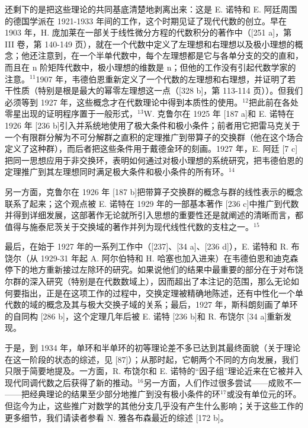 还剩下的是把这些理论的共同基底清楚地剥离出来：这是 E. 诺特和 E. 阿廷周围的德国学派在 1921-1933 年间的工作，这个时期见证了现代代数的创立。早在 1903 年，H. 庞加莱在一部关于线性微分方程的代数积分的著作中（{[}251 a{]}，第 III 卷，第 140-149 页），就在一个代数中定义了左理想和右理想以及极小理想的概念；他还注意到，在一个半单代数中，每个左理想都是它与各单分支的交的直和，而且在 n 阶矩阵代数中，极小理想的维数是 n；但他的工作没有引起代数学家的注意。\(^{11}\)1907 年，韦德伯恩重新定义了一个代数的左理想和右理想，并证明了若干性质（特别是根是最大的幂零左理想这一点（{[}328 b{]}，第 113-114 页））。但我们必须等到 1927 年，这些概念才在代数理论中得到本质性的使用。\(^{12}\)把此前在各处零星出现的证明程序置于一般形式，\(^{13}\)W. 克鲁尔在 1925 年 {[}187 a{]}和 E. 诺特在 1926 年 {[}236 b{]}引入并系统地使用了极大条件和极小条件；前者用它把雷马克关于一个有限群分解为不可分解群之直积的定理推广到带算子的交换群（他在这个场合定义了这种群），而后者把这些条件用于戴德金环的刻画。1927 年，E. 阿廷 {[}7 c{]}把同一思想应用于非交换环，表明如何通过对极小理想的系统研究，把韦德伯恩的定理推广到其左理想同时满足极大条件和极小条件的所有环。\(^{14}\)

另一方面，克鲁尔在 1926 年 {[}187 b{]}把带算子交换群的概念与群的线性表示的概念联系了起来；这个观点被 E. 诺特在 1929 年的一部基本著作 {[}236 c{]}中推广到代数并得到详细发展，这部著作无论就所引入思想的重要性还是就阐述的清晰而言，都值得与施泰尼茨关于交换域的著作并列为现代线性代数的支柱之一。\(^{15}\)

最后，在始于 1927 年的一系列工作中（{[}237{]}、{[}34 a{]}、{[}236 d{]}），E. 诺特和 R. 布饶尔（从 1929-31 年起 A. 阿尔伯特和 H. 哈塞也加入进来）在韦德伯恩和迪克森停下的地方重新接过左除环的研究。如果说他们的结果中最重要的部分在于对布饶尔群的深入研究（特别是在代数数域上），因而超出了本注记的范围，那么无论如何要指出，正是在这项工作的过程中，交换定理被精确地陈述，还有中性化一个单代数的域的概念及其与极大交换子域的关系；最后，1927 年，斯科朗刻画了单环的自同构 {[}286 b{]}，这个定理几年后被 E. 诺特 {[}236 b{]}和 R. 布饶尔 {[}34 a{]}重新发现。

于是，到 1934 年，单环和半单环的初等理论差不多已达到其最终面貌（关于理论在这一阶段的状态的综述，见 {[}87{]}）；从那时起，它朝两个不同的方向发展，我们只限于简要地提及。一方面，R. 布饶尔和 E. 诺特的“因子组”理论近来在它被并入现代同调代数之后获得了新的推动。\(^{16}\)另一方面，人们作过很多尝试——成败不一——把经典理论的结果至少部分地推广到没有极小条件的环\(^{17}\)或没有单位元的环。但迄今为止，这些推广对数学的其他分支几乎没有产生什么影响；关于这些工作的更多细节，我们请读者参看 N. 雅各布森最近的综述 {[}172 b{]}。
\relax{}
